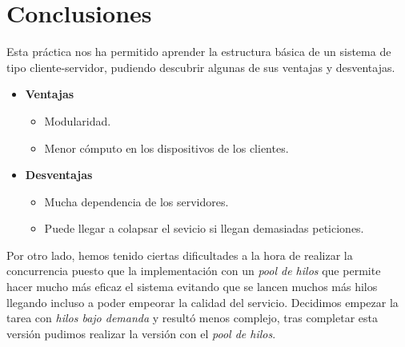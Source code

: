 \documentclass[10pt, spanish, pdftex]{template/UC3M_document}
\begin{document}
\newpage
\section{Conclusiones}
Esta práctica nos ha permitido aprender la estructura básica de un sistema de tipo cliente-servidor, pudiendo descubrir algunas de sus ventajas y desventajas.

\begin{itemize}
  \item \textbf{Ventajas}
    \begin{itemize}
      \item Modularidad.
      \item Menor cómputo en los dispositivos de los clientes.
    \end{itemize}
  \item \textbf{Desventajas}
  \begin{itemize}
    \item Mucha dependencia de los servidores.
    \item Puede llegar a colapsar el sevicio si llegan demasiadas peticiones.
  \end{itemize}
\end{itemize}

Por otro lado, hemos tenido ciertas dificultades a la hora de realizar la concurrencia puesto que la implementación con un \textit{pool de hilos} que permite hacer mucho más eficaz el sistema evitando que se lancen muchos más hilos llegando incluso a poder empeorar la calidad del servicio. Decidimos empezar la tarea con \textit{hilos bajo demanda} y resultó menos complejo, tras completar esta versión pudimos realizar la versión con el \textit{pool de hilos}.
\end{document}
